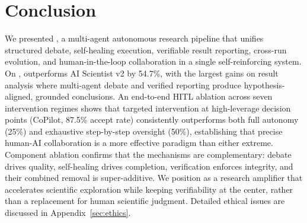 \vspace{-0.5em}
\section{Conclusion}
\label{sec:conclusion}
\vspace{-0.5em}

We presented \system{}, a multi-agent autonomous research pipeline that unifies structured debate, self-healing execution, verifiable result reporting, cross-run evolution, and human-in-the-loop collaboration in a single self-reinforcing system. On \bench, \system{} outperforms AI Scientist v2 by 54.7\%, with the largest gains on result analysis where multi-agent debate and verified reporting produce hypothesis-aligned, grounded conclusions. An end-to-end HITL ablation across seven intervention regimes shows that targeted intervention at high-leverage decision points (CoPilot, 87.5\% accept rate) consistently outperforms both full autonomy (25\%) and exhaustive step-by-step oversight (50\%), establishing that precise human-AI collaboration is a more effective paradigm than either extreme. Component ablation confirms that the mechanisms are complementary: debate drives quality, self-healing drives completion, verification enforces integrity, and their combined removal is super-additive. We position \system{} as a research amplifier that accelerates scientific exploration while keeping verifiability at the center, rather than a replacement for human scientific judgment. Detailed ethical issues are discussed in Appendix~\ref{sec:ethics}.
